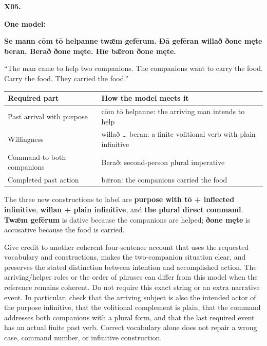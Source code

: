 \par\begin{minipage}{\linewidth}\raggedright
\textbf{X05.}

\textbf{One model:}

\textbf{Se mann cōm tō helpanne twǣm gefērum. Ðā gefēran willað ðone męte beran. Berað ðone męte. Hīe bǣron ðone męte.}

“The man came to help two companions. The companions want to carry the food. Carry the food. They carried the food.”

\par\begingroup
\fontsize{10.5}{13.2}\selectfont
\setlength{\LTleft}{0pt}\setlength{\LTright}{\fill}
\noindent
\begin{tabular}{@{}>{\raggedright\arraybackslash}p{40.74mm}>{\raggedright\arraybackslash}p{80.45mm}@{}}
\toprule
\textbf{Required part} & \textbf{How the model meets it} \\
\midrule
Past arrival with purpose & cōm tō helpanne: the arriving man intends to help \\
Willingness & willað … beran: a finite volitional verb with plain infinitive \\
Command to both companions & Berað: second-person plural imperative \\
Completed past action & bǣron: the companions carried the food \\
\bottomrule
\end{tabular}
\par\endgroup

The three new constructions to label are \textbf{purpose with tō + inflected infinitive}, \textbf{willan + plain infinitive}, and \textbf{the plural direct command}. \textbf{Twǣm gefērum} is dative because the companions are helped; \textbf{ðone męte} is accusative because the food is carried.

Give credit to another coherent four-sentence account that uses the requested vocabulary and constructions, makes the two-companion situation clear, and preserves the stated distinction between intention and accomplished action. The arriving/\allowbreak{}helper roles or the order of phrases can differ from this model when the reference remains coherent. Do not require this exact string or an extra narrative event. In particular, check that the arriving subject is also the intended actor of the purpose infinitive, that the volitional complement is plain, that the command addresses both companions with a plural form, and that the last required event has an actual finite past verb. Correct vocabulary alone does not repair a wrong case, command number, or infinitive construction.

\end{minipage}\par\addvspace{4pt}

